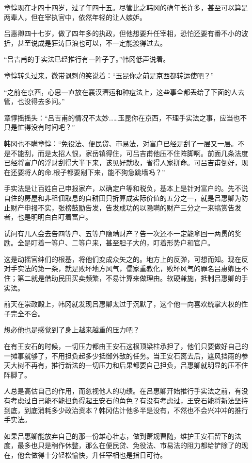 章惇现在才四十四岁，过了年四十五。尽管比之韩冈的确年长许多，甚至可以算是两辈人，但在宰执官中，依然年轻的让人嫉妒。

吕惠卿四十七岁，做了四年多的执政，但他想要升任宰相，恐怕还要有番不小的波折，甚至说成是狂涛巨浪也可以，不一定能渡得过去。

“吕吉甫的手实法已经推行有一阵子了。”韩冈低声说着。

章惇转头过来，微带讽刺的笑说着：“玉昆你之前是京西都转运使吧？”

“之前在京西，心思一直放在襄汉漕运和种痘法上，这些事全都丢给了下面的人去管，也没得去多问。”

章惇摇摇头：“吕吉甫的情况不太妙……玉昆你在京西，不理手实法之事，应当也不只是忙得没有时间吧？”

韩冈也不瞒章惇：“免役法、便民贷、市易法，对富户已经是刮了一层又一层。不是不能刮，而是太招人恨，家岳镇得住，可吕吉甫他压不住阵脚啊。前面几条法度已经将富户的浮财刮得大半下来，该见好就收，省得人家拼命。可吕吉甫倒好，现在还要将人的命.根子都要剐下来，能不狗急跳墙吗？”

手实法是让百姓自己申报家产，以确定户等和税负，基本上是针对富户的。先不说自住的房屋和非租佃取息的自耕田只折算成实际价值的五分之一，就是吕惠卿为防止财产申报不实，张榜鼓励告发，告发成功的以隐瞒的财产三分之一来犒赏告发者，也是明明白白盯着富户。

试问有几人会去告四等户、五等户隐瞒财产？告一次还不一定能拿回一两贯的奖励。全是盯着一等户、二等户来，甚至胆子大的，盯着形势户和官户。

这是动摇官绅们的根基，将他们变成众矢之的。地方上的反弹，可想而知。现在反对手实法的第一条，就是败坏地方风气，儒家重教化，败坏风气的罪名吕惠卿压不住；第二就是借助民田买卖频繁，不易计算来做理由。软硬兼施，抵制吕惠卿的手实法。

前天在崇政殿上，韩冈就发现吕惠卿太过于沉默了，这个他一向喜欢统掌大权的性子完全不合。

想必他也是感觉到了身上越来越重的压力吧？

在有王安石的时候，一切压力都由王安石这根顶梁柱承担了，他们只要做好自己的一摊事就够了，不用担负起多少抵御外敌的任务。当王安石离去后，遮风挡雨的参天大树不再有，推行新法的一切压力和后果都要自己担负，吕惠卿就明显的压不住阵脚了。

人总是高估自己的作用，而忽视他人的功绩。在吕惠卿开始推行手实法之前，有没有考虑过自己能不能担负得起王安石的角色？有没有考虑过，王安石能将新法坚持到底，到底消耗多少政治资本？韩冈估计他多半是没有，不然也不会兴冲冲的推行手实法。

如果吕惠卿能放弃自己的那一份雄心壮志，做到萧规曹随，维护王安石留下的法度，最多也只是稍作休整，那么在便民贷、免役法、市易法的阻力都给铲除了的现在，他会做得十分轻松愉快，升任宰相也是指日可待。

